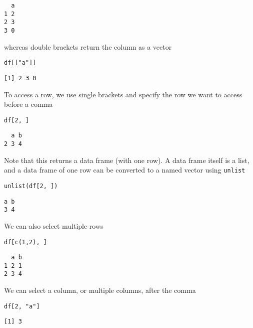 \documentclass[11pt,a4paper]{article}
\begin{document}
\begin{verbatim}
  a
1 2
2 3
3 0
\end{verbatim}

whereas double brackets return the column as a vector \\

\begin{verbatim}
df[["a"]]
\end{verbatim}

\begin{verbatim}
[1] 2 3 0
\end{verbatim}

To access a row, we use single brackets and specify the row we want to access before a comma \\

\begin{verbatim}
df[2, ]
\end{verbatim}

\begin{verbatim}
  a b
2 3 4
\end{verbatim}

Note that this returns a data frame (with one row). A data frame itself is a list, and a data frame of one row can be converted to a named vector using \texttt{unlist} \\

\begin{verbatim}
unlist(df[2, ])
\end{verbatim}

\begin{verbatim}
a b 
3 4
\end{verbatim}

We can also select multiple rows \\

\begin{verbatim}
df[c(1,2), ]
\end{verbatim}

\begin{verbatim}
  a b
1 2 1
2 3 4
\end{verbatim}

We can select a column, or multiple columns, after the comma \\

\begin{verbatim}
df[2, "a"]
\end{verbatim}

\begin{verbatim}
[1] 3
\end{verbatim}
\end{document}
